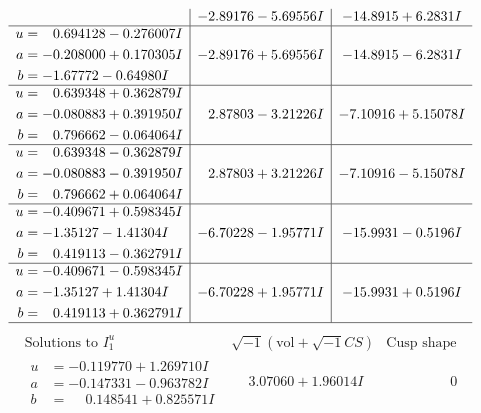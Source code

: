 \documentclass[1p]{elsarticle_modified}
\theoremstyle{definition}
\newcommand{\I}{\sqrt{-1}}
\begin{document}
$$\begin{array}{c|c|c}
 & -2.89176 - 5.69556 I & -14.8915 + 6.2831 I \\ \hline\begin{aligned}
u &= \phantom{-}0.694128 - 0.276007 I \\
a &= -0.208000 + 0.170305 I \\
b &= -1.67772 - 0.64980 I\end{aligned}
 & -2.89176 + 5.69556 I & -14.8915 - 6.2831 I \\ \hline\begin{aligned}
u &= \phantom{-}0.639348 + 0.362879 I \\
a &= -0.080883 + 0.391950 I \\
b &= \phantom{-}0.796662 - 0.064064 I\end{aligned}
 & \phantom{-}2.87803 - 3.21226 I & -7.10916 + 5.15078 I \\ \hline\begin{aligned}
u &= \phantom{-}0.639348 - 0.362879 I \\
a &= -0.080883 - 0.391950 I \\
b &= \phantom{-}0.796662 + 0.064064 I\end{aligned}
 & \phantom{-}2.87803 + 3.21226 I & -7.10916 - 5.15078 I \\ \hline\begin{aligned}
u &= -0.409671 + 0.598345 I \\
a &= -1.35127 - 1.41304 I \\
b &= \phantom{-}0.419113 - 0.362791 I\end{aligned}
 & -6.70228 - 1.95771 I & -15.9931 - 0.5196 I \\ \hline\begin{aligned}
u &= -0.409671 - 0.598345 I \\
a &= -1.35127 + 1.41304 I \\
b &= \phantom{-}0.419113 + 0.362791 I\end{aligned}
 & -6.70228 + 1.95771 I & -15.9931 + 0.5196 I\\
 \hline 
 \end{array}$$\newpage$$\begin{array}{c|c|c}  
\text{Solutions to }I^u_{1}& \I (\text{vol} + \sqrt{-1}CS) & \text{Cusp shape}\\
 \hline 
\begin{aligned}
u &= -0.119770 + 1.269710 I \\
a &= -0.147331 - 0.963782 I \\
b &= \phantom{-}0.148541 + 0.825571 I\end{aligned}
 & \phantom{-}3.07060 + 1.96014 I & \phantom{-0.000000 } 0 \\ \hline\begin{aligned}

\end{aligned}
\end{array}$$
\end{document}
